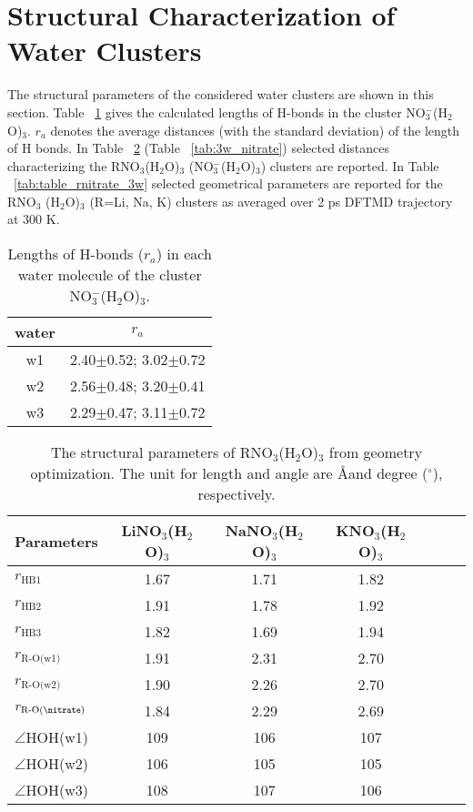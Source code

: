  \section{Structural Characterization of Water Clusters}\label{structure_of_cluster}
 The structural parameters of the considered water clusters are shown in this section.
Table ~\ref{tab:3_nitrate_bond} gives the calculated lengths of H-bonds in the cluster NO$_3^-$(H$_2$O)$_3$. $r_a$ denotes the average distances (with the standard deviation) of the length of H bonds. 
 In Table ~\ref{tab:table_geo_opt} (Table ~\ref{tab:3w_nitrate}) selected distances characterizing 
 the RNO$_3$(H$_2$O)$_3$ (NO$_3^-$(H$_2$O)$_3$) clusters are reported.
 In Table ~\ref{tab:table_rnitrate_3w} selected geometrical parameters are reported for the RNO$_3$   
 (H$_2$O)$_3$ (R=Li, Na, K) clusters as averaged over 2 ps DFTMD trajectory at 300 K.
% 
\begin{table}[!h]
\centering
\caption{\label{tab:3_nitrate_bond}%
  Lengths of H-bonds ($r_a$) in each water molecule of the cluster NO$_3^-$(H$_2$O)$_3$.} 
\begin{tabular}{cc} \\\toprule
 water & \multicolumn{1}{c}{ $r_a$}(\A)\\
\hline
 w1 &2.40$\pm$0.52; 3.02$\pm$0.72 \\
 w2 &2.56$\pm$0.48; 3.20$\pm$0.41 \\
 w3 &2.29$\pm$0.47; 3.11$\pm$0.72
\end{tabular}
\end{table}
%
\begin{table}[!htbp]
\centering
\caption{\label{tab:table_geo_opt}%
The structural parameters of RNO$_3$(H$_2$O)$_3$ from geometry optimization. 
The unit for length and angle are \AA and degree ($^\circ$), respectively.}
\begin{tabular}{l*{4}ccc}
Parameters  & LiNO$_3$(H$_2$O)$_3$& NaNO$_3$(H$_2$O)$_3$ & KNO$_3$(H$_2$O)$_3$\\
\hline
$r_\text{HB1}$& 1.67 & 1.71 & 1.82 \\
$r_\text{HB2}$& 1.91 & 1.78 & 1.92\\
$r_\text{HB3}$& 1.82 & 1.69 & 1.94\\
$r_\text{R-O(w1)}$ & 1.91 & 2.31 & 2.70\\
$r_\text{R-O(w2)}$ & 1.90 & 2.26 & 2.70\\
$r_\text{R-O(\nitrate)}$ & 1.84 & 2.29 & 2.69 \\
$\angle$HOH(w1)& 109 & 106 &107 \\
$\angle$HOH(w2)& 106 & 105&105 \\
$\angle$HOH(w3)& 108 & 107 &106
\end{tabular}
\end{table}
